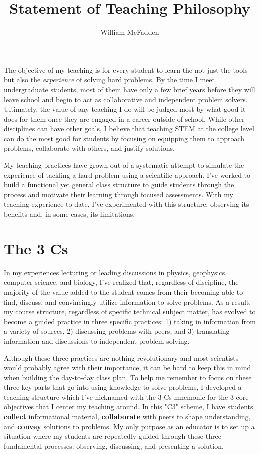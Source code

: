 \documentclass[12pt]{amsart} \usepackage{amssymb}
\title[]{Statement of Teaching Philosophy}
\author[]{William McFadden}
\begin{document}
\maketitle
\thispagestyle{empty}

The objective of my teaching is for every student to learn the not just the tools but also the {\em experience} of solving hard problems.  By the time I meet undergraduate students, most of them have only a few brief years before they will leave school and begin to act as collaborative and independent problem solvers. Ultimately, the value of any teaching I do will be judged most by what good it does for them once they are engaged in a career outside of school. While other disciplines can have other goals, I believe that teaching STEM at the college level can do the most good for students by focusing on equipping them to approach problems, collaborate with others, and justify solutions. 

My teaching practices have grown out of a systematic attempt to simulate the experience of tackling a hard problem using a scientific approach. I've worked to build a functional yet general class structure to guide students through the process and motivate their learning through focused assessments.  With my teaching experience to date, I've experimented with this structure, observing its benefits and, in some cases, its limitations.

\section*{The 3 Cs}
In my experiences lecturing or leading discussions in physics, geophysics, computer science, and biology, I've realized that, regardless of discipline, the majority of the value added to the student comes from their becoming able to find, discuss, and convincingly utilize information to solve problems. As a result, my course structure, regardless of specific technical subject matter, has evolved to become a guided practice in three specific practices: 1) taking in information from a variety of sources, 2) discussing problems with peers, and 3) translating information and discussions to independent problem solving.

Although these three practices are nothing revolutionary and most scientists would probably agree with their importance, it can be hard to keep this in mind when building the day-to-day class plan.  To help me remember to focus on these three key parts that go into using knowledge to solve problems, I developed a teaching structure which I've nicknamed with the 3 Cs mnemonic for the 3 core objectives that I center my teaching around. In this "C3" scheme, I have students \textbf{collect} informational material, \textbf{collaborate} with peers to shape understanding, and \textbf{convey} solutions to problems. My only purpose as an educator is to set up a situation where my students are repeatedly guided through these three fundamental processes: observing, discussing, and presenting a solution.
\end{document}
